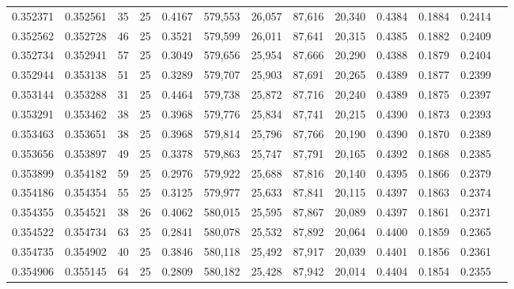 \begin{tabular}{rrrrrrrrrrrrr}
0.352371 & 0.352561 &    35 &  25 &                                     0.4167 & 579,553 &  26,057 &  87,616 &  20,340 & 0.4384 & 0.1884 & 0.2414 \\
0.352562 & 0.352728 &    46 &  25 &                                     0.3521 & 579,599 &  26,011 &  87,641 &  20,315 & 0.4385 & 0.1882 & 0.2409 \\
0.352734 & 0.352941 &    57 &  25 &                                     0.3049 & 579,656 &  25,954 &  87,666 &  20,290 & 0.4388 & 0.1879 & 0.2404 \\
0.352944 & 0.353138 &    51 &  25 &                                     0.3289 & 579,707 &  25,903 &  87,691 &  20,265 & 0.4389 & 0.1877 & 0.2399 \\
0.353144 & 0.353288 &    31 &  25 &                                     0.4464 & 579,738 &  25,872 &  87,716 &  20,240 & 0.4389 & 0.1875 & 0.2397 \\
0.353291 & 0.353462 &    38 &  25 &                                     0.3968 & 579,776 &  25,834 &  87,741 &  20,215 & 0.4390 & 0.1873 & 0.2393 \\
0.353463 & 0.353651 &    38 &  25 &                                     0.3968 & 579,814 &  25,796 &  87,766 &  20,190 & 0.4390 & 0.1870 & 0.2389 \\
0.353656 & 0.353897 &    49 &  25 &                                     0.3378 & 579,863 &  25,747 &  87,791 &  20,165 & 0.4392 & 0.1868 & 0.2385 \\
0.353899 & 0.354182 &    59 &  25 &                                     0.2976 & 579,922 &  25,688 &  87,816 &  20,140 & 0.4395 & 0.1866 & 0.2379 \\
0.354186 & 0.354354 &    55 &  25 &                                     0.3125 & 579,977 &  25,633 &  87,841 &  20,115 & 0.4397 & 0.1863 & 0.2374 \\
0.354355 & 0.354521 &    38 &  26 &                                     0.4062 & 580,015 &  25,595 &  87,867 &  20,089 & 0.4397 & 0.1861 & 0.2371 \\
0.354522 & 0.354734 &    63 &  25 &                                     0.2841 & 580,078 &  25,532 &  87,892 &  20,064 & 0.4400 & 0.1859 & 0.2365 \\
0.354735 & 0.354902 &    40 &  25 &                                     0.3846 & 580,118 &  25,492 &  87,917 &  20,039 & 0.4401 & 0.1856 & 0.2361 \\
0.354906 & 0.355145 &    64 &  25 &                                     0.2809 & 580,182 &  25,428 &  87,942 &  20,014 & 0.4404 & 0.1854 & 0.2355 \\

\end{tabular}
